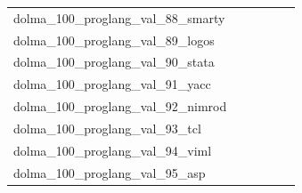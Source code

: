 \documentclass[dvipsnames]{article}
\begin{document}
\begin{appendix}
{\begin{longtable}{m{6cm}m{1.7cm}m{1.7cm}m{1.7cm}m{1.7cm}m{1.7cm}}
	dolma\_100\_proglang\_val\_88\_smarty  & \colorbox[HTML]{9ad486}{\makebox[\mywidth][c]{2.30}} & \colorbox[HTML]{edf8b2}{\makebox[\mywidth][c]{2.35}} & \colorbox[HTML]{ffffe5}{\makebox[\mywidth][c]{2.58}} & \colorbox[HTML]{77c578}{\makebox[\mywidth][c]{2.29}} & \colorbox[HTML]{95d284}{\makebox[\mywidth][c]{2.30}}\\
	dolma\_100\_proglang\_val\_89\_logos  & \colorbox[HTML]{77c578}{\makebox[\mywidth][c]{2.37}} & \colorbox[HTML]{fbfdd0}{\makebox[\mywidth][c]{2.58}} & \colorbox[HTML]{ffffe5}{\makebox[\mywidth][c]{2.98}} & \colorbox[HTML]{def2a6}{\makebox[\mywidth][c]{2.46}} & \colorbox[HTML]{d1ec9f}{\makebox[\mywidth][c]{2.44}}\\
	dolma\_100\_proglang\_val\_90\_stata  & \colorbox[HTML]{77c578}{\makebox[\mywidth][c]{4.67}} & \colorbox[HTML]{ebf7b0}{\makebox[\mywidth][c]{5.08}} & \colorbox[HTML]{ffffe5}{\makebox[\mywidth][c]{6.85}} & \colorbox[HTML]{c1e597}{\makebox[\mywidth][c]{4.85}} & \colorbox[HTML]{b3df91}{\makebox[\mywidth][c]{4.81}}\\
	dolma\_100\_proglang\_val\_91\_yacc  & \colorbox[HTML]{77c578}{\makebox[\mywidth][c]{2.42}} & \colorbox[HTML]{d3eda0}{\makebox[\mywidth][c]{2.48}} & \colorbox[HTML]{ffffe5}{\makebox[\mywidth][c]{2.87}} & \colorbox[HTML]{91d183}{\makebox[\mywidth][c]{2.44}} & \colorbox[HTML]{84cb7d}{\makebox[\mywidth][c]{2.43}}\\
	dolma\_100\_proglang\_val\_92\_nimrod  & \colorbox[HTML]{77c578}{\makebox[\mywidth][c]{2.75}} & \colorbox[HTML]{d9f0a3}{\makebox[\mywidth][c]{2.87}} & \colorbox[HTML]{ffffe5}{\makebox[\mywidth][c]{3.63}} & \colorbox[HTML]{b0de8f}{\makebox[\mywidth][c]{2.81}} & \colorbox[HTML]{8ccf81}{\makebox[\mywidth][c]{2.77}}\\
	dolma\_100\_proglang\_val\_93\_tcl  & \colorbox[HTML]{77c578}{\makebox[\mywidth][c]{3.00}} & \colorbox[HTML]{e7f5ad}{\makebox[\mywidth][c]{3.16}} & \colorbox[HTML]{ffffe5}{\makebox[\mywidth][c]{3.95}} & \colorbox[HTML]{b8e293}{\makebox[\mywidth][c]{3.07}} & \colorbox[HTML]{95d284}{\makebox[\mywidth][c]{3.02}}\\
	dolma\_100\_proglang\_val\_94\_viml  & \colorbox[HTML]{7cc77a}{\makebox[\mywidth][c]{5.56}} & \colorbox[HTML]{d8efa2}{\makebox[\mywidth][c]{5.76}} & \colorbox[HTML]{ffffe5}{\makebox[\mywidth][c]{7.21}} & \colorbox[HTML]{91d183}{\makebox[\mywidth][c]{5.59}} & \colorbox[HTML]{77c578}{\makebox[\mywidth][c]{5.55}}\\
	dolma\_100\_proglang\_val\_95\_asp  & \colorbox[HTML]{d9f0a3}{\makebox[\mywidth][c]{1.79}} & \colorbox[HTML]{dcf1a5}{\makebox[\mywidth][c]{1.79}} & \colorbox[HTML]{ffffe5}{\makebox[\mywidth][c]{1.90}} & \colorbox[HTML]{77c578}{\makebox[\mywidth][c]{1.77}} & \colorbox[HTML]{84cb7d}{\makebox[\mywidth][c]{1.77}}\\

\end{longtable}}
\end{appendix}
\end{document}
